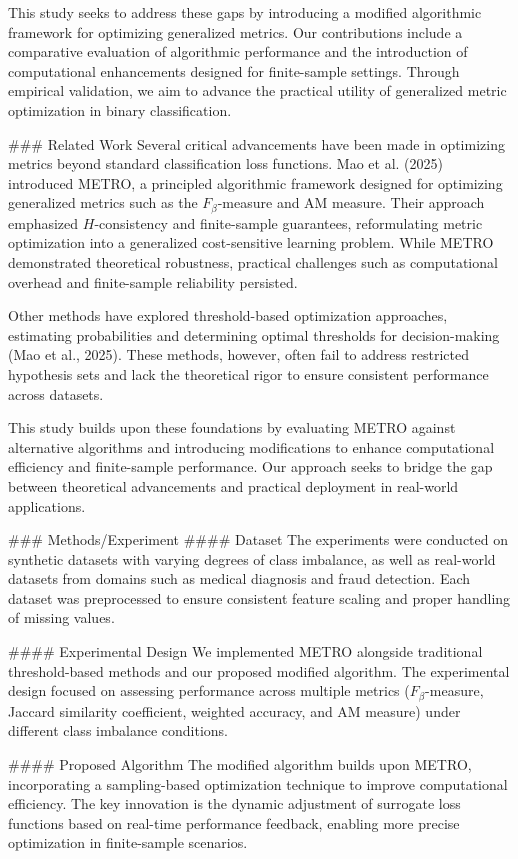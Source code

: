 This study seeks to address these gaps by introducing a modified algorithmic framework for optimizing generalized metrics. Our contributions include a comparative evaluation of algorithmic performance and the introduction of computational enhancements designed for finite-sample settings. Through empirical validation, we aim to advance the practical utility of generalized metric optimization in binary classification.

### Related Work  
Several critical advancements have been made in optimizing metrics beyond standard classification loss functions. Mao et al. (2025) introduced METRO, a principled algorithmic framework designed for optimizing generalized metrics such as the \(F_\beta\)-measure and AM measure. Their approach emphasized \(H\)-consistency and finite-sample guarantees, reformulating metric optimization into a generalized cost-sensitive learning problem. While METRO demonstrated theoretical robustness, practical challenges such as computational overhead and finite-sample reliability persisted.

Other methods have explored threshold-based optimization approaches, estimating probabilities and determining optimal thresholds for decision-making (Mao et al., 2025). These methods, however, often fail to address restricted hypothesis sets and lack the theoretical rigor to ensure consistent performance across datasets.

This study builds upon these foundations by evaluating METRO against alternative algorithms and introducing modifications to enhance computational efficiency and finite-sample performance. Our approach seeks to bridge the gap between theoretical advancements and practical deployment in real-world applications.

### Methods/Experiment  
#### Dataset  
The experiments were conducted on synthetic datasets with varying degrees of class imbalance, as well as real-world datasets from domains such as medical diagnosis and fraud detection. Each dataset was preprocessed to ensure consistent feature scaling and proper handling of missing values.

#### Experimental Design  
We implemented METRO alongside traditional threshold-based methods and our proposed modified algorithm. The experimental design focused on assessing performance across multiple metrics (\(F_\beta\)-measure, Jaccard similarity coefficient, weighted accuracy, and AM measure) under different class imbalance conditions.

#### Proposed Algorithm  
The modified algorithm builds upon METRO, incorporating a sampling-based optimization technique to improve computational efficiency. The key innovation is the dynamic adjustment of surrogate loss functions based on real-time performance feedback, enabling more precise optimization in finite-sample scenarios.


